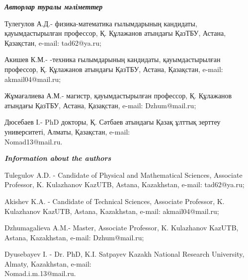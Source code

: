 \begin{authorinfo}
\emph{{\bfseries Авторлар туралы мәліметтер}}

Тулегулов А.Д.- физика-математика ғылымдарының кандидаты,
қауымдастырылған профессор, Қ. Құлажанов атындағы ҚазТБУ, Астана,
Қазақстан, e-mail: tad62@ya.ru;

Акишев К.М.- -техника ғылымдарының кандидаты, қауымдастырылған
профессор, Қ. Құлажанов атындағы ҚазТБУ, Астана, Қазақстан, e-mail:
akmail04@mail.ru;

Жұмағалиева А.М.- магистр, қауымдастырылған профессор, Қ. Құлажанов
атындағы ҚазТБУ, Астана, Қазақстан, e-mail:
Dzhum@mail.ru;

Дюсебаев І.- PhD докторы, Қ. Сәтбаев атындағы Қазақ ұлттық зерттеу
университеті, Алматы, Қазақстан, e-mail:\\
Nomad13@mail.ru.

\emph{{\bfseries Information about the authors}}

Tulegulov A.D. - Candidate of Physical and Mathematical Sciences,
Associate Professor, K. Kulazhanov KazUTB, Astana, Kazakhstan, e-mail:
tad62@ya.ru;

Akishev K.A. - Candidate of Technical Sciences, Associate Professor, K.
Kulazhanov KazUTB, Astana, Kazakhstan, e-mail: akmail04@mail.ru;

Dzhumagalieva A.M.- Master, Associate Professor, K. Kulazhanov
KazUTB, Astana, Kazakhstan, e-mail: Dzhum@mail.ru;

Dyusebayev I. - Dr. PhD, K.I. Satpayev Kazakh National Research
University, Almaty, Kazakhstan, e-mail: \\Nomad.i.m.13@mail.ru.
\end{authorinfo}
